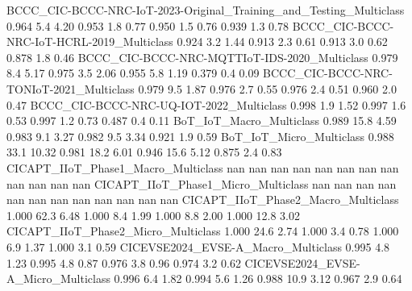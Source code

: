 BCCC_CIC-BCCC-NRC-IoT-2023-Original_Training_and_Testing_Multiclass   0.964       5.4      4.20      0.953          1.8         0.77      0.950          1.5         0.76       0.939           1.3          0.78
BCCC_CIC-BCCC-NRC-IoT-HCRL-2019_Multiclass                            0.924       3.2      1.44      0.913          2.3         0.61      0.913          3.0         0.62       0.878           1.8          0.46
BCCC_CIC-BCCC-NRC-MQTTIoT-IDS-2020_Multiclass                         0.979       8.4      5.17      0.975          3.5         2.06      0.955          5.8         1.19       0.379           0.4          0.09
BCCC_CIC-BCCC-NRC-TONIoT-2021_Multiclass                              0.979       9.5      1.87      0.976          2.7         0.55      0.976          2.4         0.51       0.960           2.0          0.47
BCCC_CIC-BCCC-NRC-UQ-IOT-2022_Multiclass                              0.998       1.9      1.52      0.997          1.6         0.53      0.997          1.2         0.73       0.487           0.4          0.11
BoT_IoT_Macro_Multiclass                                              0.989      15.8      4.59      0.983          9.1         3.27      0.982          9.5         3.34       0.921           1.9          0.59
BoT_IoT_Micro_Multiclass                                              0.988      33.1     10.32      0.981         18.2         6.01      0.946         15.6         5.12       0.875           2.4          0.83
CICAPT_IIoT_Phase1_Macro_Multiclass                                     nan       nan       nan        nan          nan          nan        nan          nan          nan         nan           nan           nan
CICAPT_IIoT_Phase1_Micro_Multiclass                                     nan       nan       nan        nan          nan          nan        nan          nan          nan         nan           nan           nan
CICAPT_IIoT_Phase2_Macro_Multiclass                                   1.000      62.3      6.48      1.000          8.4         1.99      1.000          8.8         2.00       1.000          12.8          3.02
CICAPT_IIoT_Phase2_Micro_Multiclass                                   1.000      24.6      2.74      1.000          3.4         0.78      1.000          6.9         1.37       1.000           3.1          0.59
CICEVSE2024_EVSE-A_Macro_Multiclass                                   0.995       4.8      1.23      0.995          4.8         0.87      0.976          3.8         0.96       0.974           3.2          0.62
CICEVSE2024_EVSE-A_Micro_Multiclass                                   0.996       6.4      1.82      0.994          5.6         1.26      0.988         10.9         3.12       0.967           2.9          0.64

